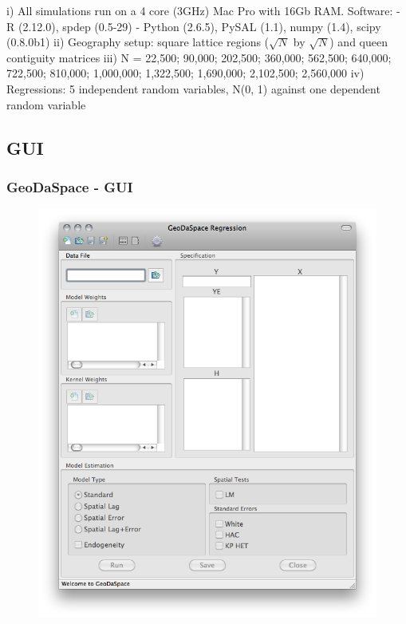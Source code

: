 \documentclass[nototal]{beamer}
\begin{document}
\begin{frame}
\begin{tiny}
  i) All simulations run on a 4 core (3GHz) Mac Pro with 16Gb RAM.
  Software:
  \linebreak
  \qquad- R (2.12.0), spdep (0.5-29)
  \qquad- Python (2.6.5), PySAL (1.1), numpy (1.4), scipy (0.8.0b1)
  \linebreak
  ii) Geography setup: square lattice regions ($\sqrt{N}$ by $\sqrt{N}$) and queen
  contiguity matrices
  \linebreak
  iii) N = 22,500; 90,000; 202,500; 360,000; 562,500; 640,000; 722,500;
  810,000; 1,000,000; 1,322,500; 1,690,000; 2,102,500; 2,560,000
  \linebreak
  iv) Regressions: 5 independent random variables, N(0, 1) against one dependent random variable
  \end{tiny}
 \end{frame} 

\subsection{GUI} 

\begin{frame}
	\frametitle{GeoDaSpace - GUI}
  \begin{figure}
  \includegraphics[scale=0.25]{figs/gs1.png}
  \end{figure}
 \end{frame} 
\end{document}
